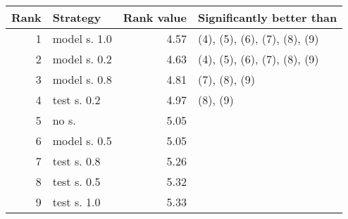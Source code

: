 \begin{tabular}{ r l r l}
\textbf{Rank} & \textbf{Strategy} & \textbf{Rank value} & \textbf{Significantly better than} \\
\hline
1     & model s. 1.0    & 4.57    & (4), (5), (6), (7), (8), (9) \\
2    & model s. 0.2    & 4.63    & (4), (5), (6), (7), (8), (9) \\
3    & model s. 0.8    & 4.81    & (7), (8), (9) \\
4    & test s. 0.2        & 4.97    & (8), (9) \\
5    & no s.                 & 5.05    & \\
6    & model s. 0.5    & 5.05    & \\
7    & test s. 0.8        & 5.26    & \\
8    & test s. 0.5        & 5.32    & \\
9    & test s. 1.0        & 5.33    & \\
\end{tabular}